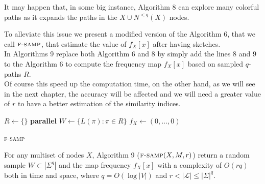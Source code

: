 \clearpage

It may happen that, in some big instance, Algorithm 8 
can explore many colorful paths as it expands the paths in the $X \cup N^{<q}(X)$ nodes.

To alleviate this issue we present a modified version of the Algorithm 6,
that we call $\textsc{f-samp}$, that estimate the value of $f_{X}[x]$ after having sketches.\\

In Algorithms 9 replace both Algorithm 6 and 8 by simply add the lines $8$ and $9$ to the Algorithm 6
to compute the frequency map $f_{X}[x]$ based on sampled $q$-paths $R$.\\

Of course this speed up the computation time, 
on the other hand, as we will see in the next chapter, 
the accuracy will be affected and we will need a greater value of $r$ 
to have a better estimation of the similarity indices.

\begin{algorithm}[h]
	\small
	\DontPrintSemicolon
	$R \gets \{\}$\;
	\BlankLine
	\textbf{parallel} 
	\BlankLine
	$W \gets \{ L(\pi) : \pi \in R \}$\;
	\BlankLine
	$f_X \gets (0,\ldots,0)$\;
	\BlankLine
	\caption{\textsc{f-samp}}
	\label{alg:randomsample}
	\label{alg:sample}
\end{algorithm}

\begin{lemma}
	For any multiset of nodes $X$, 
	Algorithm 9 ($\textsc{f-samp}(X, M, r)$) return a random sample $W \subset |\Sigma^{q}|$ and the map frequency $f_{X}[x]$
	with a complexity of $O(rq)$ both in time and space, 
	where $q = O(\log |V|)$ and $r < |\mathcal{L}| \leq |\Sigma|^{q}$.
\end{lemma}

